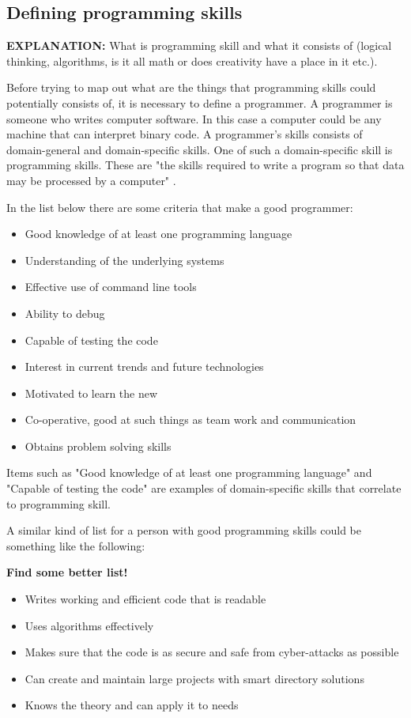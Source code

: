 \documentclass[11pt,a4paper,oneside,article]{memoir}
\begin{document}
\subsection{Defining programming skills}
\textbf{EXPLANATION:} What is programming skill and what it consists of (logical thinking, algorithms, is it all math or does creativity have a place in it etc.).

Before trying to map out what are the things that programming skills could potentially consists of, it is necessary to define a programmer. A programmer is someone who writes computer software. In this case a computer could be any machine that can interpret binary code. A programmer's skills consists of domain-general and domain-specific skills. One of such a domain-specific skill is programming skills. These are "the skills required to write a program so that data may be processed by a computer" \cite{collins:skills}.  

In the list below there are some criteria that make a good programmer:
\vspace{-17pt} 
\begin{itemize}
\item Good knowledge of at least one programming language
\item Understanding of the underlying systems
\item Effective use of command line tools
\item Ability to debug
\item Capable of testing the code
\item Interest in current trends and future technologies
\item Motivated to learn the new
\item Co-operative, good at such things as team work and communication
\item Obtains problem solving skills
\end{itemize}
\vspace{-17pt}

Items such as "Good knowledge of at least one programming language" and "Capable of testing the code" are examples of domain-specific skills that correlate to programming skill.

A similar kind of list for a person with good programming skills could be something like the following:

\textbf{Find some better list!}

\vspace{-17pt} 
\begin{itemize}
\item Writes working and efficient code that is readable
\item Uses algorithms effectively
\item Makes sure that the code is as secure and safe from cyber-attacks as possible
\item Can create and maintain large projects with smart directory solutions
\item Knows the theory and can apply it to needs
\end{itemize}
\vspace{-17pt}
\end{document}
